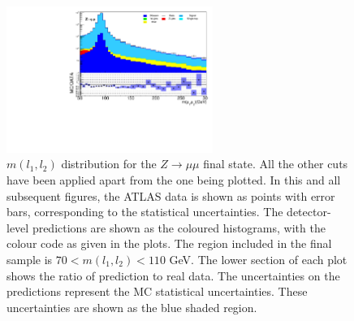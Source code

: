 \begin{figure}[htbp]
	\centering
	\includegraphics[width=0.6\textwidth]{figures/Fig7.pdf}
	\caption{$m(l_1,l_2)$ distribution for the $Z\to\mu\mu$ final state. All the other cuts have been applied apart from the one being plotted. In this and all subsequent figures, the ATLAS data is shown as points with error bars, corresponding to the statistical uncertainties. The detector-level predictions are shown as the coloured histograms, with the colour code as given in the plots. The region included in the final sample is $70<m(l_1,l_2)<11	0$ GeV. The lower section of each plot shows the ratio of prediction to real data. The uncertainties on the predictions represent the MC statistical uncertainties. These uncertainties are shown as the blue shaded region.}
	\label{Fig7s}
\end{figure}

